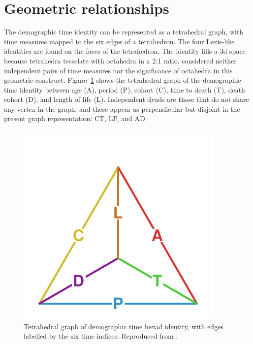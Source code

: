 \section{Geometric relationships}
  The demographic time identity can be represented as a tetrahedral graph, with time measures mapped to the six edges of a tetrahedron. The four Lexis-like identities are found on the faces of the tetrahedron. The identity fills a 3d space because tetrahedra tesselate with octahedra in a 2:1 ratio. \citet{riffe2017demographictime} considered neither independent pairs of time measures nor the significance of octahedra in this geometric construct. Figure~\ref{fig:tet} shows the tetrahedral graph of the demographic time identity between age (A), period (P), cohort (C), time to death (T), death cohort (D), and length of life (L). Independent dyads are those that do not share any vertex in the graph, and these appear as perpendicular but disjoint in the present graph representation: CT, LP, and AD.

\begin{figure}[h!]
\centering
\includegraphics[width=4in]{Figures/TetraHedronEdgesOnly.pdf}
\caption{Tetrahedral graph of demographic time hexad identity, with edges
labelled by the six time indices. Reproduced from 
\citet{riffe2017demographictime}.}
\label{fig:tet}
\end{figure}

